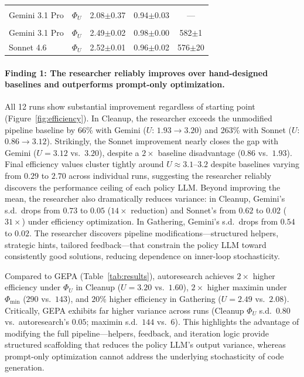 \documentclass[10pt,twocolumn]{article}
\begin{document}
\begin{table}[t]
\begin{tabular}{@{}llccc@{}}
\addlinespace
\multicolumn{5}{@{}l}{\emph{Gathering ($N{=}4$) --- GEPA~\cite{agrawal2026}}} \\
Gemini 3.1 Pro & $\Phi_U$ & 2.08{\scriptsize$\pm$0.37} & 0.94{\scriptsize$\pm$0.03} & --- \\
\addlinespace
\multicolumn{5}{@{}l}{\emph{Gathering ($N{=}4$) --- Autoresearch}} \\
Gemini 3.1 Pro & $\Phi_U$ & 2.49{\scriptsize$\pm$0.02} & 0.98{\scriptsize$\pm$0.00} & 582{\scriptsize$\pm$1} \\
Sonnet 4.6 & $\Phi_U$ & 2.52{\scriptsize$\pm$0.01} & 0.96{\scriptsize$\pm$0.02} & 576{\scriptsize$\pm$20} \\
\bottomrule
\end{tabular}
\end{table}

\paragraph{Finding 1: The researcher reliably improves over hand-designed baselines and outperforms prompt-only optimization.}
All 12 runs show substantial improvement regardless of starting point (Figure~\ref{fig:efficiency}). In Cleanup, the researcher exceeds the unmodified pipeline baseline by 66\% with Gemini ($U$: $1.93 \to 3.20$) and 263\% with Sonnet ($U$: $0.86 \to 3.12$). Strikingly, the Sonnet improvement nearly closes the gap with Gemini ($U{=}3.12$ vs.\ $3.20$), despite a $2\times$ baseline disadvantage ($0.86$ vs.\ $1.93$). Final efficiency values cluster tightly around $U \approx 3.1$--$3.2$ despite baselines varying from $0.29$ to $2.70$ across individual runs, suggesting the researcher reliably discovers the performance ceiling of each policy LLM. Beyond improving the mean, the researcher also dramatically reduces variance: in Cleanup, Gemini's s.d.\ drops from $0.73$ to $0.05$ ($14\times$ reduction) and Sonnet's from $0.62$ to $0.02$ ($31\times$) under efficiency optimization. In Gathering, Gemini's s.d.\ drops from $0.54$ to $0.02$. The researcher discovers pipeline modifications---structured helpers, strategic hints, tailored feedback---that constrain the policy LLM toward consistently good solutions, reducing dependence on inner-loop stochasticity.

Compared to GEPA (Table~\ref{tab:results}), autoresearch achieves $2{\times}$ higher efficiency under $\Phi_U$ in Cleanup ($U{=}3.20$ vs.\ $1.60$), $2{\times}$ higher maximin under $\Phi_{\min}$ ($290$ vs.\ $143$), and $20\%$ higher efficiency in Gathering ($U{=}2.49$ vs.\ $2.08$). Critically, GEPA exhibits far higher variance across runs (Cleanup $\Phi_U$ s.d.\ $0.80$ vs.\ autoresearch's $0.05$; maximin s.d.\ $144$ vs.\ $6$). This highlights the advantage of modifying the full pipeline---helpers, feedback, and iteration logic provide structured scaffolding that reduces the policy LLM's output variance, whereas prompt-only optimization cannot address the underlying stochasticity of code generation.
\end{document}

